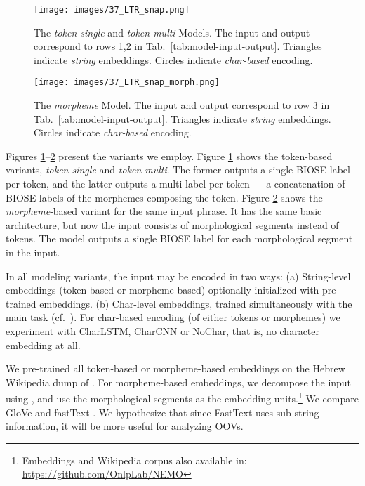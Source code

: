 \documentclass[11pt,a4paper]{article}
\newcommand{\TOKMACRO}{{\em token-single}\xspace}
\newcommand{\MULMACRO}{{\em token-multi}\xspace}
\newcommand{\MORMACRO}{{\em morpheme}\xspace}
\begin{document}
\begin{figure}[t]
\centering
  \texttt{[image: images/37\_LTR\_snap.png]}
\caption{\label{fig:token-model} 
  The \TOKMACRO and \MULMACRO Models. The input and output correspond to rows 1,2 in Tab.\ \ref{tab:model-input-output}. Triangles indicate   {\em string} embeddings. Circles indicate   {\em char-based} encoding.}
\end{figure}

\begin{figure}[t]
\centering
  \texttt{[image: images/37\_LTR\_snap\_morph.png]}
\caption{\label{fig:morph-model} 
  The \MORMACRO Model. The input and output correspond to row 3 in Tab.\ \ref{tab:model-input-output}. Triangles indicate  {\em string} embeddings. Circles indicate   {\em char-based} encoding.}
\end{figure}



Figures \ref{fig:token-model}--\ref{fig:morph-model} present  the   variants we employ. 
Figure \ref{fig:token-model} shows   the token-based variants, \TOKMACRO and \MULMACRO.
The former outputs a single BIOSE  label per  token, and the latter 
 outputs a multi-label per token --- a concatenation of 
 BIOSE labels of the morphemes composing the  token. Figure \ref{fig:morph-model} shows the \MORMACRO-based variant for the same input phrase. It has the same basic architecture, but now the input consists of  morphological segments instead of tokens.  The model outputs a single BIOSE label for each morphological segment in the input.
 
 
In all modeling variants, the input may be encoded in two  ways: 
(a) String-level embeddings (token-based or morpheme-based) optionally initialized with pre-trained embeddings.
(b) Char-level embeddings, trained simultaneously with the main task 
(cf.\ \citet{DBLP:journals/corr/MaH16,DBLP:journals/corr/ChiuN15,DBLP:journals/corr/LampleBSKD16}). 
For char-based encoding (of either tokens or morphemes) we experiment with CharLSTM,  CharCNN or NoChar, that is, no character embedding at all.
 

We pre-trained all  token-based or morpheme-based embeddings on the  Hebrew Wikipedia dump of . For morpheme-based embeddings, 
we  decompose the input using  , and use the morphological segments as the embedding units.\footnote{Embeddings and Wikipedia corpus also available in: \scriptsize{\url{https://github.com/OnlpLab/NEMO}}} 
We compare GloVe \cite{pennington-etal-2014-glove} and fastText \cite{bojanowski2017enriching}. 
We hypothesize  that since FastText uses sub-string information, it will be more useful for analyzing OOVs.
\end{document}
